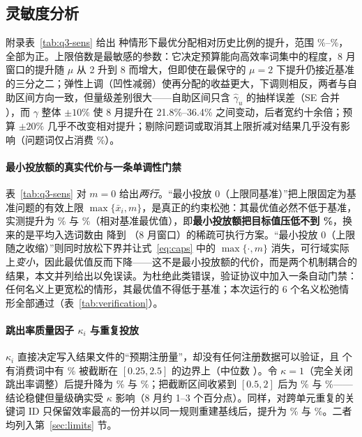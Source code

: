 \subsection{灵敏度分析}
\label{sec:val-sens}
附录表~\ref{tab:q3-sens} 给出 \valQthreeSensScenarios{} 种情形下最优分配相对历史比例的提升，范围 \valQthreeSensMinGainPct\%--\valQthreeSensMaxGainPct\%，全部为正。上限倍数是最敏感的参数：它决定预算能向高效率词集中的程度，8 月窗口的提升随 $\mu$ 从 2 升到 8 而增大，但即使在最保守的 $\mu=2$ 下提升仍接近基准的三分之二；弹性上调（凹性减弱）使再分配的收益更大，下调则相反，两者与自助区间方向一致，但量级差别很大——自助区间只含 $\hat\gamma_u$ 的抽样误差（SE 合并 \valPooledGammaSe），而 $\gamma$ 整体 $\pm10\%$ 使 8 月提升在 21.8\%--36.4\% 之间变动，后者宽约十余倍；预算 $\pm20\%$ 几乎不改变相对提升；剔除问题词或取消其上限折减对结果几乎没有影响（问题词仅占消费 \valProblemSpendSharePct\%）。

\paragraph{最小投放额的真实代价与一条单调性门禁}
表~\ref{tab:q3-sens} 对 $m=0$ 给出\emph{两行}。“最小投放 0（上限同基准）”把上限固定为基准问题的有效上限 $\max\{\bar x_i,m\}$，是真正的约束松弛：其最优值必然不低于基准，实测提升为 \valQthreeFloorCostPctFeb\% 与 \valQthreeFloorCostPctAug\%（相对基准最优值），即\textbf{最小投放额把目标值压低不到 \valQthreeFloorCostPctAug\%}，换来的是平均入选词数由 \valQthreeSelectedNoFloorAug{} 降到 \valQthreeSelectedBaseAug（8 月窗口）的稀疏可执行方案。“最小投放 0（上限随之收缩）”则同时放松下界并让式~\eqref{eq:caps} 中的 $\max\{\cdot,m\}$ 消失，可行域实际上\emph{变小}，因此最优值反而下降——这不是最小投放额的代价，而是两个机制耦合的结果，本文并列给出以免误读。为杜绝此类错误，验证协议中加入一条自动门禁：任何名义上更宽松的情形，其最优值不得低于基准；本次运行的 6 个名义松弛情形全部通过（表~\ref{tab:verification}）。

\paragraph{跳出率质量因子 $\kappa_i$ 与重复投放}
$\kappa_i$ 直接决定写入结果文件的“预期注册量”，却没有任何注册数据可以验证，且 \valKappaRows{} 个有消费词中有 \valKappaAtBoundPct\% 被截断在 $[0.25,2.5]$ 的边界上（中位数 \valKappaMedian）。令 $\kappa=1$（完全关闭跳出率调整）后提升降为 \valQthreeKappaOneGainPctFeb\% 与 \valQthreeKappaOneGainPctAug\%；把截断区间收紧到 $[0.5,2]$ 后为 \valQthreeKappaClipGainPctFeb\% 与 \valQthreeKappaClipGainPctAug\%——结论稳健但量级确实受 $\kappa$ 影响（8 月约 1--3 个百分点）。同样，对跨单元重复的关键词 ID 只保留效率最高的一份并以同一规则重建基线后，提升为 \valQthreeDupBestGainPctFeb\% 与 \valQthreeDupBestGainPctAug\%。二者均列入第~\ref{sec:limits} 节。

